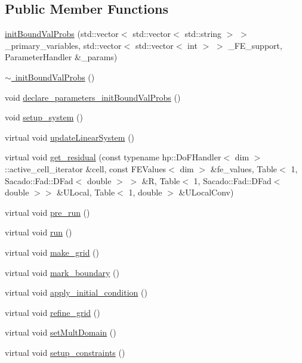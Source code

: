 \subsection*{Public Member Functions}
\begin{DoxyCompactItemize}
\item 
\mbox{\hyperlink{classinit_bound_val_probs_af836a88e7f9df1d43d6f93c4747858fe}{init\+Bound\+Val\+Probs}} (std\+::vector$<$ std\+::vector$<$ std\+::string $>$ $>$ \+\_\+primary\+\_\+variables, std\+::vector$<$ std\+::vector$<$ int $>$ $>$ \+\_\+\+F\+E\+\_\+support, Parameter\+Handler \&\+\_\+params)
\item 
\mbox{\hyperlink{classinit_bound_val_probs_a56066f199b4a30dfd060e6e1b0a78c03}{$\sim$ init\+Bound\+Val\+Probs}} ()
\item 
void \mbox{\hyperlink{classinit_bound_val_probs_af60fa8844da68c0cd887b300855c086c}{declare\+\_\+parameters\+\_\+init\+Bound\+Val\+Probs}} ()
\item 
void \mbox{\hyperlink{classinit_bound_val_probs_a8f0c6272cf214048329d7cf1aa58b860}{setup\+\_\+system}} ()
\item 
virtual void \mbox{\hyperlink{classinit_bound_val_probs_af78c2c6284234c93872188334fb997d8}{update\+Linear\+System}} ()
\item 
virtual void \mbox{\hyperlink{classinit_bound_val_probs_ac8f2c3e2a1040c70b709900dc3dfdaea}{get\+\_\+residual}} (const typename hp\+::\+Do\+F\+Handler$<$ dim $>$\+::active\+\_\+cell\+\_\+iterator \&cell, const F\+E\+Values$<$ dim $>$ \&fe\+\_\+values, Table$<$ 1, Sacado\+::\+Fad\+::\+D\+Fad$<$ double $>$ $>$ \&R, Table$<$ 1, Sacado\+::\+Fad\+::\+D\+Fad$<$ double $>$$>$ \&U\+Local, Table$<$ 1, double $>$ \&U\+Local\+Conv)
\item 
virtual void \mbox{\hyperlink{classinit_bound_val_probs_a7a8df3f99e1d582c6c136b16d6e34d13}{pre\+\_\+run}} ()
\item 
virtual void \mbox{\hyperlink{classinit_bound_val_probs_a13a43e6d814de94978c515cb084873b1}{run}} ()
\item 
virtual void \mbox{\hyperlink{classinit_bound_val_probs_aadd4943e52767516f3f7c5460ea35032}{make\+\_\+grid}} ()
\item 
virtual void \mbox{\hyperlink{classinit_bound_val_probs_a7ed791f6f2c777286743182bf2f481bf}{mark\+\_\+boundary}} ()
\item 
virtual void \mbox{\hyperlink{classinit_bound_val_probs_a8d32e81a32f1aaf5682065458548e8e2}{apply\+\_\+initial\+\_\+condition}} ()
\item 
virtual void \mbox{\hyperlink{classinit_bound_val_probs_aea55077652a6fc58f1c0c250c4abd856}{refine\+\_\+grid}} ()
\item 
virtual void \mbox{\hyperlink{classinit_bound_val_probs_a5fb25d0981afa1f7d87875fffcc272c1}{set\+Mult\+Domain}} ()
\item 
virtual void \mbox{\hyperlink{classinit_bound_val_probs_a97967f7bc5aba9a2158464d2de9d2352}{setup\+\_\+constraints}} ()
\end{DoxyCompactItemize}
